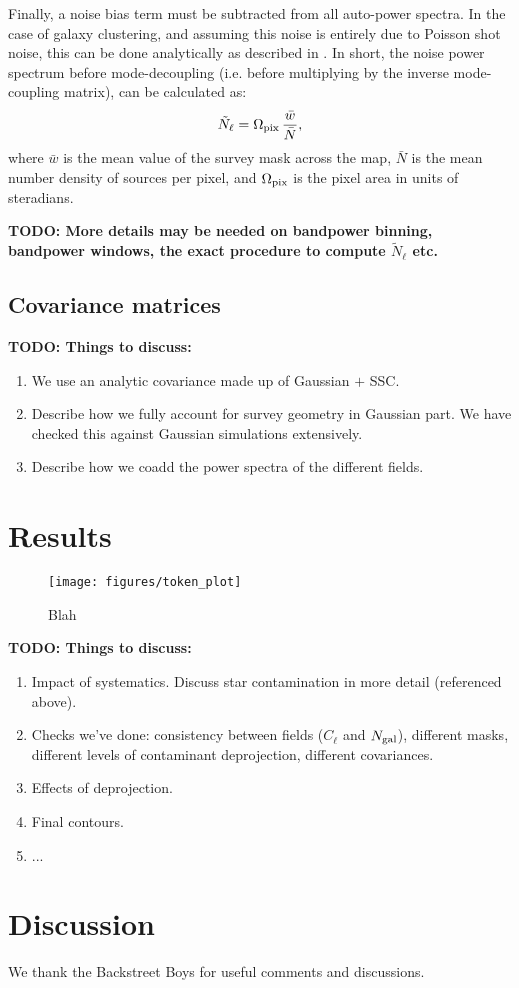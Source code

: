 \documentclass[a4paper,11pt]{article}
\newcommand{\todo}[1]{{\bf TODO: #1}}
\begin{document}
    Finally, a noise bias term must be subtracted from all auto-power spectra. In the case of galaxy clustering, and assuming this noise is entirely due to Poisson shot noise, this can be done analytically as described in \cite{2019MNRAS.484.4127A}. In short, the noise power spectrum before mode-decoupling (i.e. before multiplying by the inverse mode-coupling matrix), can be calculated as:
    \begin{equation}
      \tilde{N}_\ell = \Omega_{\rm pix}\,\frac{\bar{w}}{\bar{N}},
    \end{equation}
    where $\bar{w}$ is the mean value of the survey mask across the map, $\bar{N}$ is the mean number density of sources per pixel, and $\Omega_{\rm pix}$ is the pixel area in units of steradians.
    
    \todo{More details may be needed on bandpower binning, bandpower windows, the exact procedure to compute $\tilde{N}_\ell$ etc.}

  \subsection{Covariance matrices}\label{ssec:methods.covar}
    \todo{Things to discuss:}
    \begin{enumerate}
      \item We use an analytic covariance made up of Gaussian $+$ SSC.
      \item Describe how we fully account for survey geometry in Gaussian part. We have checked this against Gaussian simulations extensively.
      \item Describe how we coadd the power spectra of the different fields.
    \end{enumerate}
    
\section{Results}\label{sec:results}
  \lipsum[8]
  \begin{figure}
    \centering
    \texttt{[image: figures/token\_plot]}
    \caption{Blah}\label{fig:token}
  \end{figure}
  \todo{Things to discuss:}
  \begin{enumerate}
    \item Impact of systematics. Discuss star contamination in more detail (referenced above).
    \item Checks we've done: consistency between fields ($C_\ell$ and $N_{\rm gal}$), different masks, different levels of contaminant deprojection, different covariances.
    \item Effects of deprojection.
    \item Final contours.
    \item ...
  \end{enumerate}

\section{Discussion}\label{sec:discussion}
  \lipsum[9]

\acknowledgments

We thank the Backstreet Boys for useful comments and discussions.


\end{document}
